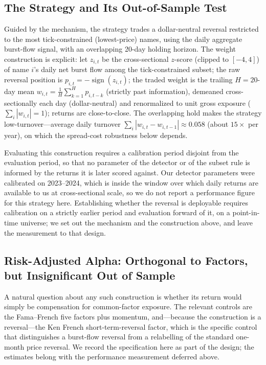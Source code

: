 \documentclass[11pt]{article}
\begin{document}
\subsection{The Strategy and Its Out-of-Sample Test}
Guided by the mechanism, the strategy trades a dollar-neutral reversal restricted to the most tick-constrained (lowest-price) names, using the daily aggregate burst-flow signal, with an overlapping 20-day holding horizon. The weight construction is explicit: let $z_{i,t}$ be the cross-sectional $z$-score (clipped to $[-4,4]$) of name $i$'s daily net burst flow among the tick-constrained subset; the raw reversal position is $p_{i,t}=-\operatorname{sign}(z_{i,t})$; the traded weight is the trailing $H{=}20$-day mean $w_{i,t}=\frac{1}{H}\sum_{k=1}^{H}p_{i,t-k}$ (strictly past information), demeaned cross-sectionally each day (dollar-neutral) and renormalized to unit gross exposure ($\sum_i|w_{i,t}|=1$); returns are close-to-close. The overlapping hold makes the strategy low-turnover---average daily turnover $\sum_i|w_{i,t}-w_{i,t-1}|\approx0.058$ (about $15\times$ per year), on which the spread-cost robustness below depends.

Evaluating this construction requires a calibration period disjoint from the evaluation period, so that no parameter of the detector or of the subset rule is informed by the returns it is later scored against. Our detector parameters were calibrated on 2023--2024, which is inside the window over which daily returns are available to us at cross-sectional scale, so we do not report a performance figure for this strategy here. Establishing whether the reversal is deployable requires calibration on a strictly earlier period and evaluation forward of it, on a point-in-time universe; we set out the mechanism and the construction above, and leave the measurement to that design.



\subsection{Risk-Adjusted Alpha: Orthogonal to Factors, but Insignificant Out of Sample}
A natural question about any such construction is whether its return would simply be compensation for common-factor exposure. The relevant controls are the Fama--French five factors plus momentum, and---because the construction is a reversal---the Ken French short-term-reversal factor, which is the specific control that distinguishes a burst-flow reversal from a relabelling of the standard one-month price reversal. We record the specification here as part of the design; the estimates belong with the performance measurement deferred above.
\end{document}
